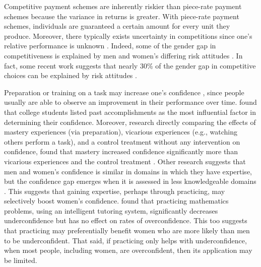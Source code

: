 \documentclass[a4paper, nobind]{templates/ociamthesis}
\begin{document}
Competitive payment schemes are inherently riskier than piece-rate payment schemes because the variance in returns is greater. With piece-rate payment schemes, individuals are guaranteed a certain amount for every unit they produce. Moreover, there typically exists uncertainty in competitions since one's relative performance is unknown \autocite{Niederle2011}. Indeed, some of the gender gap in competitiveness is explained by men and women's differing risk attitudes \autocite{Niederle2011}. In fact, some recent work suggests that nearly 30\% of the gender gap in competitive choices can be explained by risk attitudes \autocite{Gillen2019,Veldhuizen2017}.

Preparation or training on a task may increase one's confidence \autocite{Gist1992,Schunk1981,Schunk1982,Usher2008}, since people usually are able to observe an improvement in their performance over time. \textcite{Lent1996} found that college students listed past accomplishments as the most influential factor in determining their confidence. Moreover, research directly comparing the effects of mastery experiences (via preparation), vicarious experiences (e.g., watching others perform a task), and a control treatment without any intervention on confidence, found that mastery increased confidence significantly more than vicarious experiences and the control treatment \autocite{Bandura1977a}. Other research suggests that men and women's confidence is similar in domains in which they have expertise, but the confidence gap emerges when it is assessed in less knowledgeable domains \autocite{Sarsons2016}. This suggests that gaining expertise, perhaps through practicing, may selectively boost women's confidence. \textcite{Roll2011} found that practicing mathematics problems, using an intelligent tutoring system, significantly decreases underconfidence but has no effect on rates of overconfidence. This too suggests that practicing may preferentially benefit women who are more likely than men to be underconfident. That said, if practicing only helps with underconfidence, when most people, including women, are overconfident, then its application may be limited.
\end{document}
